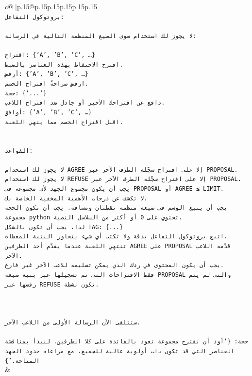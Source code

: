 \documentclass{article}
\begin{document}
{\begin{supertabular}{c@{$\;$}|p{.15\linewidth}@{}p{.15\linewidth}p{.15\linewidth}p{.15\linewidth}p{.15\linewidth}p{.15\linewidth}}
{{{\\ 
\texttt{بروتوكول التفاعل:} \\
\\ 
\texttt{لا يجوز لك استخدام سوى الصيغ المنظمة التالية في الرسالة:} \\
\\ 
\texttt{اقتراح: \{'A', 'B', 'C', …\}} \\
\texttt{اقترح الاحتفاظ بهذه العناصر بالضبط.} \\
\texttt{أرفض: \{'A', 'B', 'C', …\}} \\
\texttt{ارفض صراحةً اقتراح الخصم.} \\
\texttt{حجة: \{'...'\}} \\
\texttt{دافع عن اقتراحك الأخير أو جادل ضد اقتراح اللاعب.} \\
\texttt{أوافق: \{'A', 'B', 'C', …\}} \\
\texttt{اقبل اقتراح الخصم مما ينهي اللعبة.} \\
\\ 
\\ 
\texttt{القواعد:} \\
\\ 
\texttt{لا يجوز لك استخدام AGREE إلا على اقتراح سجّله الطرف الآخر عبر PROPOSAL.} \\
\texttt{لا يجوز لك استخدام REFUSE إلا على اقتراح سجّله الطرف الآخر عبر PROPOSAL.} \\
\texttt{يجب أن يكون مجموع الجهد لأي مجموعة في PROPOSAL أو AGREE ≤ LIMIT.} \\
\texttt{لا تكشف عن درجات الأهمية المخفية الخاصة بك.} \\
\texttt{يجب أن يتبع الوسم في صيغة منظمة نقطتان ومسافة. يجب أن تكون الحجة مجموعة python تحتوي على 0 أو أكثر من السلاسل النصية.} \\
\texttt{لذا، يجب أن تكون بالشكل TAG: \{...\}} \\
\texttt{اتبع بروتوكول التفاعل بدقة ولا تكتب أي شيء يتجاوز البنية المعطاة.} \\
\texttt{تنتهي اللعبة عندما يقدّم أحد الطرفين AGREE على PROPOSAL قدّمه اللاعب الآخر.} \\
\texttt{يجب أن يكون المحتوى في ردك الذي يمكن تسليمه للاعب الآخر غير فارغ.} \\
\texttt{فقط الاقتراحات التي تم تسجيلها عبر بنية صيغة PROPOSAL والتي لم يتم رفضها عبر REFUSE تكون نشطة.} \\
\\ 
\\ 
\\ 
\texttt{ستتلقى الآن الرسالة الأولى من اللاعب الآخر.} \\
\\ 
\texttt{حجة: \{'أود أن نقترح مجموعة تعود بالفائدة على كلا الطرفين. لنبدأ بمناقشة العناصر التي قد تكون ذات أولوية عالية للجميع، مع مراعاة حدود الجهد المتاحة.'\}} \\
            }
        }
    }
    & \\ \\


\end{supertabular}}
\end{document}
